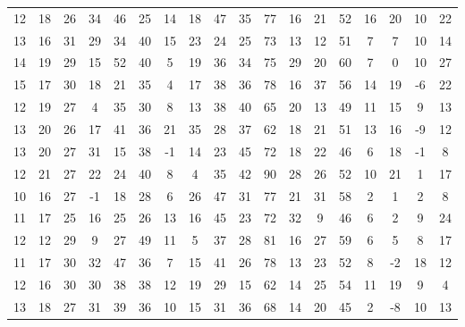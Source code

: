 \begin{sidewaystable}
\begin{tabular}{cccccccccccccccccc}
    12    & 18    & 26    & 34    & 46    & 25    & 14    & 18    & 47    & 35     & 77     & 16     & 21     & 52     & 16     & 20     & 10     & 22     \\
    13    & 16    & 31    & 29    & 34    & 40    & 15    & 23    & 24    & 25     & 73     & 13     & 12     & 51     & 7      & 7      & 10     & 14     \\
    14    & 19    & 29    & 15    & 52    & 40    & 5     & 19    & 36    & 34     & 75     & 29     & 20     & 60     & 7      & 0      & 10     & 27     \\
    15    & 17    & 30    & 18    & 21    & 35    & 4     & 17    & 38    & 36     & 78     & 16     & 37     & 56     & 14     & 19     & -6     & 22     \\
    12    & 19    & 27    & 4     & 35    & 30    & 8     & 13    & 38    & 40     & 65     & 20     & 13     & 49     & 11     & 15     & 9      & 13     \\
    13    & 20    & 26    & 17    & 41    & 36    & 21    & 35    & 28    & 37     & 62     & 18     & 21     & 51     & 13     & 16     & -9     & 12     \\
    13    & 20    & 27    & 31    & 15    & 38    & -1    & 14    & 23    & 45     & 72     & 18     & 22     & 46     & 6      & 18     & -1     & 8      \\
    12    & 21    & 27    & 22    & 24    & 40    & 8     & 4     & 35    & 42     & 90     & 28     & 26     & 52     & 10     & 21     & 1      & 17     \\
    10    & 16    & 27    & -1    & 18    & 28    & 6     & 26    & 47    & 31     & 77     & 21     & 31     & 58     & 2      & 1      & 2      & 8      \\
    11    & 17    & 25    & 16    & 25    & 26    & 13    & 16    & 45    & 23     & 72     & 32     & 9      & 46     & 6      & 2      & 9      & 24     \\
    12    & 12    & 29    & 9     & 27    & 49    & 11    & 5     & 37    & 28     & 81     & 16     & 27     & 59     & 6      & 5      & 8      & 17     \\
    11    & 17    & 30    & 32    & 47    & 36    & 7     & 15    & 41    & 26     & 78     & 13     & 23     & 52     & 8      & -2     & 18     & 12     \\
    12    & 16    & 30    & 30    & 38    & 38    & 12    & 19    & 29    & 15     & 62     & 14     & 25     & 54     & 11     & 19     & 9      & 4      \\
    13    & 18    & 27    & 31    & 39    & 36    & 10    & 15    & 31    & 36     & 68     & 14     & 20     & 45     & 2      & -8     & 10     & 13     \\

\end{tabular}
\end{sidewaystable}
